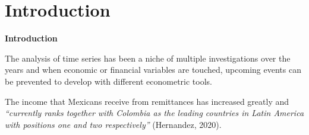 \section{Introduction}
\textbf{Introduction}

The analysis of time series has been a niche of multiple investigations over the years and when economic or financial variables are touched, upcoming events can be prevented to develop with different econometric tools.\par
The income that Mexicans receive from remittances has increased greatly and \textit{“currently ranks together with Colombia as the leading countries in Latin America with positions one and two respectively”} (Hernandez, 2020). \par
